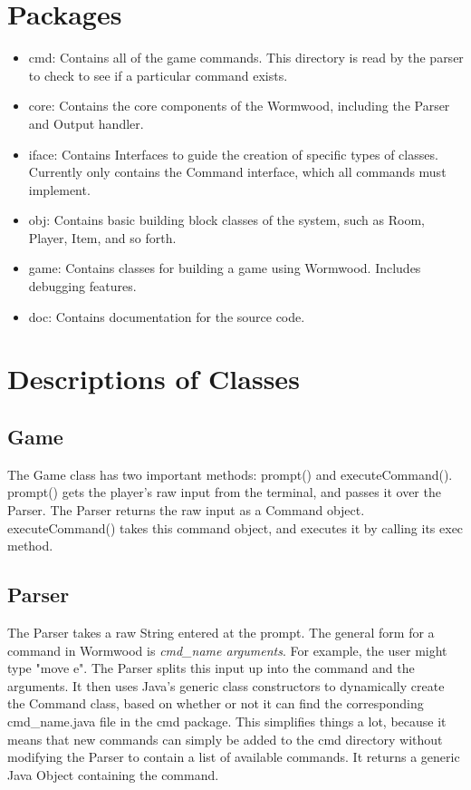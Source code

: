 \documentclass[12pt]{report}
\begin{document}
\section{Packages}
\begin{itemize}
\item cmd: Contains all of the game commands. This directory is read by the parser to check to see if a particular command exists.
\item core: Contains the core components of the Wormwood, including the Parser and Output handler.
\item iface: Contains Interfaces to guide the creation of specific types of classes. Currently only contains the Command interface, which all commands must implement.
\item obj: Contains basic building block classes of the system, such as Room, Player, Item, and so forth.
\item game: Contains classes for building a game using Wormwood. Includes debugging features. 
\item doc: Contains documentation for the source code.
\end{itemize}

\section{Descriptions of Classes}
\subsection{Game}
The Game class has two important methods: prompt() and executeCommand(). prompt() gets the player's raw input from the terminal, and passes it over the Parser. The Parser returns the raw input as a Command object. executeCommand() takes this command object, and executes it by calling its exec method.

\subsection{Parser}
The Parser takes a raw String entered at the prompt. The general form for a command in Wormwood is \textit{cmd\_name arguments}. For example, the user might type "move e". The Parser splits this input up into the command and the arguments.  It then uses Java's generic class constructors to dynamically create the Command class, based on whether or not it can find the corresponding cmd\_name.java file in the cmd package. This simplifies things a lot, because it means that new commands can simply be added to the cmd directory without modifying the Parser to contain a list of available commands. It returns a generic Java Object containing the command. 
\end{document}
